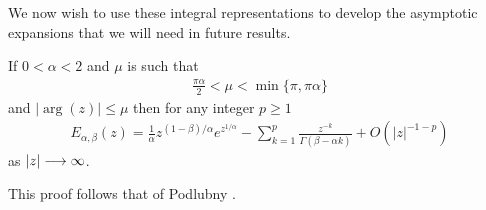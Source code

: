 We now wish to use these integral representations to develop the asymptotic expansions that we will need in future results.
\begin{mdframed}[innertopmargin=10pt]
\begin{lemma}
    \label{lem:mit_lef_asym_exp_1}
    If $ 0 < \alpha < 2 $ and $ \mu $ is such that
    \begin{align}
        \frac{\pi \alpha}{2} < \mu < \min\{\pi, \pi\alpha \}
    \end{align}
    and $ | \arg(z) | \leq \mu $
    then for any integer $ p \geq 1 $    
    \begin{align}
        E_{\alpha, \beta}(z) = \frac{1}{\alpha} z^{(1 - \beta) / \alpha} e^{z^{1/\alpha}} - \sum_{k=1}^p \frac{z^{-k}}{\Gamma(\beta - \alpha k)} + O(|z|^{-1-p})
    \end{align}
    as $ |z| \longrightarrow \infty $.
\end{lemma}
\end{mdframed}
This proof follows that of Podlubny \cite{Podlubny1999}.
